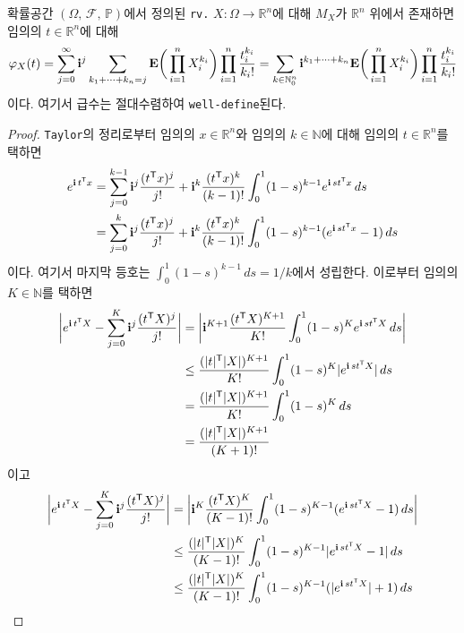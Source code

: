 \begin{theorem}
    확률공간 $(\Omega,\,\mathcal{F},\,\mathbb{P})$에서 정의된 \texttt{rv.} $X:\Omega\to\mathbb{R}^n$에 대해 $M_X$가 $\mathbb{R}^n$ 위에서 존재하면 임의의 $t\in\mathbb{R}^n$에 대해
    \begin{equation*}
        \varphi_X(t)=\sum_{j=0}^\infty\mathbf{i}^j\sum_{k_1+\cdots+k_n=j}\mathbf{E}\bigg(\prod_{i=1}^nX_i^{k_i}\bigg)\prod_{i=1}^n\frac{t_i^{k_i}}{k_i!}=\sum_{k\in\mathbb{N}_0^n}\mathbf{i}^{k_1+\cdots+k_n}\mathbf{E}\bigg(\prod_{i=1}^nX_i^{k_i}\bigg)\prod_{i=1}^n\frac{t_i^{k_i}}{k_i!}
    \end{equation*}
    이다. 여기서 급수는 절대수렴하여 \texttt{well-define}된다.
\end{theorem}

\begin{proof}
    \texttt{Taylor}의 정리로부터 임의의 $x\in\mathbb{R}^n$와 임의의 $k\in\mathbb{N}$에 대해 임의의 $t\in\mathbb{R}^n$를 택하면
    \begin{align*}
        e^{\mathbf{i}\,t^{\mathsf{T}} x}&=\sum_{j=0}^{k-1}\mathbf{i}^j\frac{(t^{\mathsf{T}} x)^j}{j!}+\mathbf{i}^k\frac{(t^{\mathsf{T}} x)^k}{(k-1)!}\int_0^1(1-s)^{k-1}e^{\mathbf{i}\,st^{\mathsf{T}} x}\,ds\\
        &=\sum_{j=0}^k\mathbf{i}^j\frac{(t^{\mathsf{T}} x)^j}{j!}+\mathbf{i}^k\frac{(t^{\mathsf{T}} x)^k}{(k-1)!}\int_0^1(1-s)^{k-1}(e^{\mathbf{i}\,st^{\mathsf{T}} x}-1)\,ds
    \end{align*}
    이다. 여기서 마지막 등호는 $\int_0^1(1-s)^{k-1}\,ds=1/k$에서 성립한다. 이로부터 임의의 $K\in\mathbb{N}$를 택하면
    \begin{align*}
        \bigg|e^{\mathbf{i}\,t^{\mathsf{T}} X}-\sum_{j=0}^K\mathbf{i}^j\frac{(t^{\mathsf{T}} X)^j}{j!}\bigg|&=\bigg|\mathbf{i}^{K+1}\frac{(t^{\mathsf{T}} X)^{K+1}}{K!}\int_0^1(1-s)^Ke^{\mathbf{i}\,st^{\mathsf{T}} X}\,ds\bigg|\\
        &\leq\frac{(|t|^{\mathsf{T}}|X|)^{K+1}}{K!}\int_0^1(1-s)^K|e^{\mathbf{i}\,st^{\mathsf{T}} X}|\,ds\\
        &=\frac{(|t|^{\mathsf{T}}|X|)^{K+1}}{K!}\int_0^1(1-s)^K\,ds\\
        &=\frac{(|t|^{\mathsf{T}}|X|)^{K+1}}{(K+1)!}
    \end{align*}
    이고
    \begin{align*}
        \bigg|e^{\imag\,t^\trans X}-\sum_{j=0}^K\imag^j\frac{(t^\trans X)^j}{j!}\bigg|&=\bigg|\imag^K\frac{(t^\trans X)^K}{(K-1)!}\int_0^1(1-s)^{K-1}(e^{\imag\,st^\trans X}-1)\,ds\bigg|\\
        &\leq\frac{(|t|^\trans|X|)^K}{(K-1)!}\int_0^1(1-s)^{K-1}|e^{\imag\,st^\trans X}-1|\,ds\\
        &\leq\frac{(|t|^\trans|X|)^K}{(K-1)!}\int_0^1(1-s)^{K-1}(|e^{\imag\,st^\trans X}|+1)\,ds\\

\end{align*}
\end{proof}
